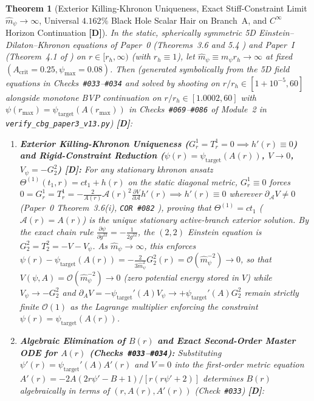 \documentclass[11pt,a4paper]{article}
\newcommand{\catD}{\textbf{\textcolor{blue!75!black}{[D]}}}
\theoremstyle{plain}
\newtheorem{theorem}{Theorem}[section]
\theoremstyle{definition}
\theoremstyle{remark}
\numberwithin{equation}{section}
\begin{document}
\begin{theorem}[Exterior Killing-Khronon Uniqueness, Exact Stiff-Constraint Limit $\hat{m}_{\psi} \to \infty$, Universal $4.162\%$ Black Hole Scalar Hair on Branch~A, and $C^{\infty}$ Horizon Continuation \catD]
\label{thm:universal_bh_hair_limit}
In the static, spherically symmetric 5D Einstein--Dilaton--Khronon equations of \textit{Paper~0} (Theorems~3.6 and 5.4 \cite{jimenez2026_p0}) and \textit{Paper~I} (Theorem~4.1 of \cite{jimenez2026a}) on $r \in [r_h, \infty)$ (with $r_h \equiv 1$), let $\hat{m}_{\psi} \equiv m_{\psi}r_h \to \infty$ at fixed $(A_{\text{crit}} = 0.25, \psi_{\max} = 0.08)$. Then (generated symbolically from the 5D field equations in Checks~\texttt{\#033}--\texttt{\#034} and solved by shooting on $r/r_h \in [1 + 10^{-5}, 60]$ alongside monotone BVP continuation on $r/r_h \in [1.0002, 60]$ with $\psi(r_{\max}) = \psi_{\text{target}}(A(r_{\max}))$ in Checks~\texttt{\#069}--\texttt{\#086} of Module~2 in \allowbreak\texttt{verify\_cbg\_paper3\_v13.py}) \catD:
\begin{enumerate}
  \item[\textnormal{(i)}] \textbf{Exterior Killing-Khronon Uniqueness ($G^1_r = T^1_r = 0 \implies h'(r) \equiv 0$) and Rigid-Constraint Reduction ($\psi(r) = \psi_{\text{target}}(A(r))$, $V \to 0$, $V_{\psi} = -G^2_2$) \catD:} For any stationary khronon ansatz $\Theta^{(1)}(t_1, r) = ct_1 + h(r)$ on the static diagonal metric, $G^1_r \equiv 0$ forces $0 = G^1_r = T^1_r = -\frac{2}{A(r)}\mathcal{A}(r)^2\frac{\partial V}{\partial\mathcal{A}}h'(r) \implies h'(r) \equiv 0$ wherever $\partial_{\mathcal{A}}V \neq 0$ (\textit{Paper~0} Theorem~3.6(i), \texttt{COR \#082} \cite{jimenez2026_p0}), proving that $\Theta^{(1)} = ct_1$ ($\mathcal{A}(r) = A(r)$) is the unique stationary active-branch exterior solution. By the exact chain rule $\frac{\partial\psi}{\partial g^{22}} = -\frac{1}{2g^{22}}$, the $(2,2)$ Einstein equation is $G^2_2 = T^2_2 = -V - V_{\psi}$. As $\hat{m}_{\psi} \to \infty$, this enforces $\psi(r) - \psi_{\text{target}}(A(r)) = -\frac{2}{3\hat{m}_{\psi}^2}G^2_2(r) = \mathcal{O}(\hat{m}_{\psi}^{-2}) \to 0$, so that $V(\psi, A) = \mathcal{O}(\hat{m}_{\psi}^{-2}) \to 0$ (zero potential energy stored in $V$) while $V_{\psi} \to -G^2_2$ and $\partial_A V = -\psi_{\text{target}}'(A)V_{\psi} \to +\psi_{\text{target}}'(A)G^2_2$ remain strictly finite $\mathcal{O}(1)$ as the Lagrange multiplier enforcing the constraint $\psi(r) = \psi_{\text{target}}(A(r))$.
  \item[\textnormal{(ii)}] \textbf{Algebraic Elimination of $B(r)$ and Exact Second-Order Master ODE for $A(r)$ (Checks~\texttt{\#033}--\texttt{\#034}):} Substituting $\psi'(r) = \psi_{\text{target}}'(A)A'(r)$ and $V = 0$ into the first-order metric equation $A'(r) = -2A(2r\psi' - B + 1)/[r(r\psi' + 2)]$ determines $B(r)$ algebraically in terms of $(r, A(r), A'(r))$ (Check~\texttt{\#033}) \catD:

\end{enumerate}
\end{theorem}
\end{document}
